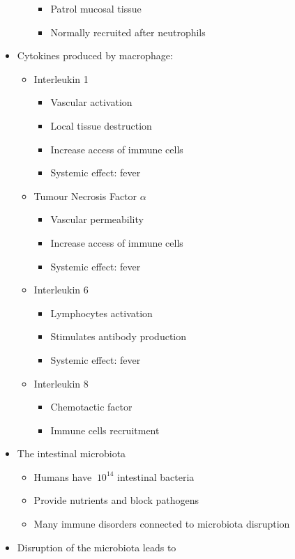 \documentclass[a4paper, 12pt]{article}
\begin{document}
\begin{itemize}
\begin{itemize}
\begin{itemize}
\item{Patrol mucosal tissue}
\item{Normally recruited after neutrophils}
\end{itemize}
\end{itemize}
\item{Cytokines produced by macrophage:}
\begin{itemize}
\item{Interleukin 1}
\begin{itemize}
\item{Vascular activation}
\item{Local tissue destruction}
\item{Increase access of immune cells}
\item{Systemic effect: fever}
\end{itemize}
\item{Tumour Necrosis Factor $\alpha$}
\begin{itemize}
\item{Vascular permeability}
\item{Increase access of immune cells}
\item{Systemic effect: fever}
\end{itemize}
\item{Interleukin 6}
\begin{itemize}
\item{Lymphocytes activation}
\item{Stimulates antibody production}
\item{Systemic effect: fever}
\end{itemize}
\item{Interleukin 8}
\begin{itemize}
\item{Chemotactic factor}
\item{Immune cells recruitment}
\end{itemize}
\end{itemize}
\item{The intestinal microbiota}
\begin{itemize}
\item{Humans have $~10^{14}$ intestinal bacteria}
\item{Provide nutrients and block pathogens}
\item{Many immune disorders connected to microbiota disruption}
\end{itemize}
\item{Disruption of the microbiota leads to}
\begin{itemize}

\end{itemize}
\end{itemize}
\end{document}
